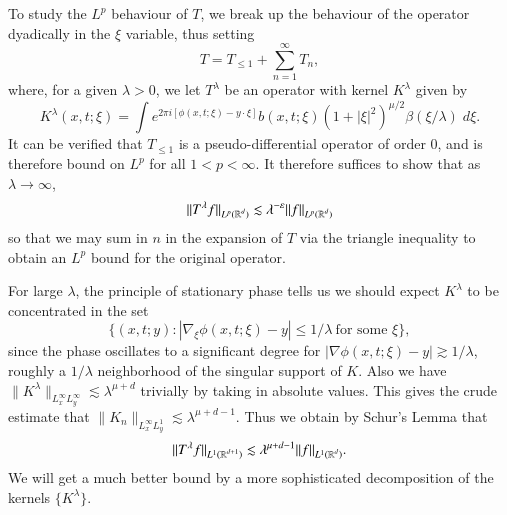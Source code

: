 
To study the $L^p$ behaviour of $T$, we break up the behaviour of the operator dyadically in the $\xi$ variable, thus setting
%
\[ T = T_{\leq 1} + \sum_{n = 1}^\infty T_n, \]
%
where, for a given $\lambda > 0$, we let $T^\lambda$ be an operator with kernel $K^\lambda$ given by
%
\[ K^\lambda(x,t;\xi) = \int e^{2 \pi i [\phi(x,t;\xi) - y \cdot \xi]} b(x,t;\xi) (1 + |\xi|^2)^{\mu/2} \beta(\xi / \lambda)\; d\xi. \]
%
It can be verified that $T_{\leq 1}$ is a pseudo-differential operator of order 0, and is therefore bound on $L^p$ for all $1 < p < \infty$. It therefore suffices to show that as $\lambda \to \infty$,
%
\[ \| T^\lambda f \|_{L^p(\operatorname{\mathbb{R}}^d)} \lesssim \lambda^{- \varepsilon} \| f \|_{L^p(\operatorname{\mathbb{R}}^d)} \]
%
so that we may sum in $n$ in the expansion of $T$ via the triangle inequality to obtain an $L^p$ bound for the original operator.

For large $\lambda$, the principle of stationary phase tells us we should expect $K^\lambda$ to be concentrated in the set
%
\[ \{ (x,t;y) : |\nabla_\xi \phi(x,t;\xi) - y| \leq 1/\lambda\ \text{for some $\xi$} \}, \]
%
since the phase oscillates to a significant degree for $|\nabla \phi(x,t;\xi) - y| \gtrsim 1/\lambda$, roughly a $1/\lambda$ neighborhood of the singular support of $K$. Also we have $\| K^\lambda \|_{L^\infty_x L^\infty_y} \lesssim \lambda^{\mu + d}$ trivially by taking in absolute values. This gives the crude estimate that $\| K_n \|_{L^\infty_x L^1_y} \lesssim \lambda^{\mu + d - 1}$. Thus we obtain by Schur's Lemma that
%
\[ \| T^\lambda f \|_{L^1(\operatorname{\mathbb{R}}^{d+1})} \lesssim \lambda^{\mu + d - 1} \| f \|_{L^1(\operatorname{\mathbb{R}}^d)}. \]
%
We will get a much better bound by a more sophisticated decomposition of the kernels $\{ K^\lambda \}$.

